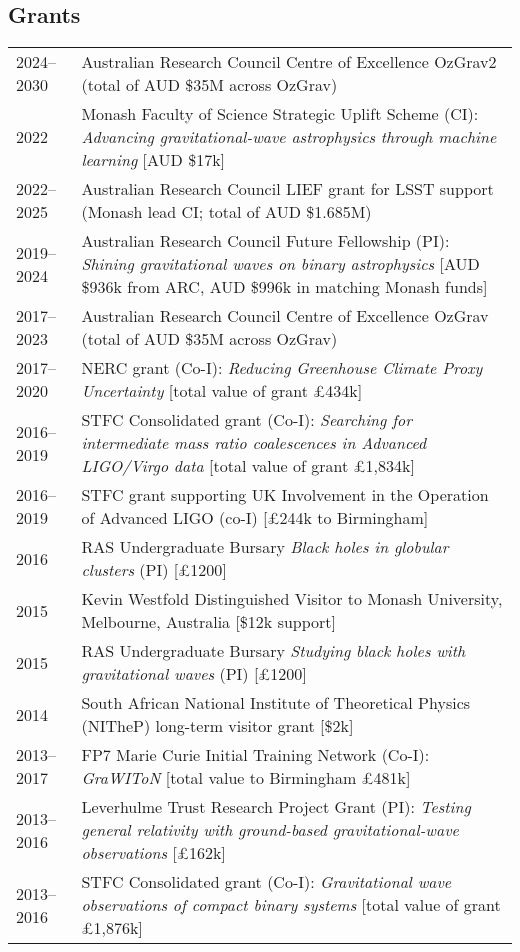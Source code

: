 \documentclass[margin,line]{res}
\begin{document}
\begin{resume}
\section{\sc Grants}
\begin{tabular}{@{}p{0.8in}p{4.7in}}
2024--2030 & Australian Research Council Centre of Excellence OzGrav2 (total of AUD \$35M across OzGrav)\\
2022 & Monash Faculty of Science Strategic Uplift Scheme (CI): {\it Advancing gravitational-wave astrophysics through machine learning} [AUD \$17k]\\
2022--2025 &  Australian Research Council LIEF grant for LSST support (Monash lead CI; total of AUD \$1.685M)\\
2019--2024 & Australian Research Council Future Fellowship (PI): {\it  Shining gravitational waves on binary astrophysics} [AUD \$936k from ARC, AUD \$996k in matching Monash funds]\\
2017--2023 & Australian Research Council Centre of Excellence OzGrav (total of AUD \$35M across OzGrav)\\
2017--2020 & NERC grant (Co-I): {\it Reducing Greenhouse Climate Proxy Uncertainty} [total value of grant \pounds 434k]\\
2016--2019 & STFC Consolidated grant (Co-I): {\it Searching for intermediate mass ratio coalescences in Advanced LIGO/Virgo data} [total value of grant \pounds1,834k]\\
2016--2019 & STFC grant supporting UK Involvement in the Operation of Advanced LIGO (co-I) [\pounds 244k to Birmingham]\\
2016 & RAS Undergraduate Bursary {\it Black holes in globular clusters} (PI) [\pounds 1200]\\
2015 & Kevin Westfold Distinguished Visitor to Monash University, Melbourne, Australia [\$12k support]\\
2015 & RAS Undergraduate Bursary {\it Studying black holes with gravitational waves} (PI) [\pounds 1200]\\
2014 & South African National Institute of Theoretical Physics (NITheP) long-term visitor grant [\$2k]\\
2013--2017 & FP7 Marie Curie Initial Training Network (Co-I): {\it GraWIToN} [total value to Birmingham \pounds 481k]\\
2013--2016 & Leverhulme Trust Research Project Grant (PI): {\it Testing general relativity with ground-based gravitational-wave observations} [\pounds162k]\\
2013--2016 & STFC Consolidated grant (Co-I): {\it Gravitational wave observations of compact binary systems} [total value of grant \pounds1,876k]\\

\end{tabular}
\end{resume}
\end{document}
